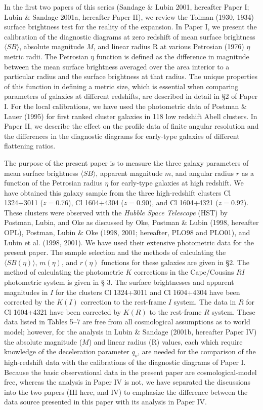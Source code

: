 \documentclass[preprint]{aastex}
\begin{document}
In the first two papers of this series (Sandage \& Lubin 2001,
hereafter Paper I; Lubin \& Sandage 2001a, hereafter Paper II), we
review the Tolman (1930, 1934) surface brightness test for the reality
of the expansion. In Paper I, we present the calibration of the
diagnostic diagrams at zero redshift of mean surface brightness
$\langle SB \rangle$, absolute magnitude $M$, and linear radius R at
various Petrosian (1976) $\eta$ metric radii. The Petrosian $\eta$
function is defined as the difference in magnitude between the mean
surface brightness averaged over the area interior to a particular
radius and the surface brightness at that radius. The unique
properties of this function in defining a metric size, which is
essential when comparing parameters of galaxies at different
redshifts, are described in detail in \S2 of Paper I.  For the local
calibrations, we have used the photometric data of Postman \& Lauer
(1995) for first ranked cluster galaxies in 118 low redshift Abell
clusters. In Paper II, we describe the effect on the profile data of
finite angular resolution and the differences in the diagnostic
diagrams for early-type galaxies of different flattening ratios.
         
The purpose of the present paper is to measure the three galaxy
parameters of mean surface brightness $\langle SB \rangle$, apparent
magnitude $m$, and angular radius $r$ as a function of the Petrosian
radius $\eta$ for early-type galaxies at high redshift. We have
obtained this galaxy sample from the three high-redshift clusters Cl
1324+3011 ($z = 0.76$), Cl 1604+4304 ($z = 0.90$), and Cl 1604+4321
($z = 0.92$). These clusters were observed with the {\it Hubble Space
Telescope} (HST) by Postman, Lubin, and Oke as discussed by Oke,
Postman \& Lubin (1998, hereafter OPL), Postman, Lubin \& Oke (1998,
2001; hereafter, PLO98 and PLO01), and Lubin et al. (1998, 2001). We
have used their extensive photometric data for the present paper.  The
sample selection and the methods of calculating the $\langle SB (\eta)
\rangle$, $m(\eta)$, and $r(\eta)$ functions for these galaxies are
given in \S 2. The method of calculating the photometric $K$
corrections in the Cape/Cousins $RI$ photometric system is given in \S
3. The surface brightnesses and apparent magnitudes in $I$ for the
clusters Cl 1324+3011 and Cl 1604+4304 have been corrected by the
$K(I)$ correction to the rest-frame $I$ system.  The data in $R$ for
Cl 1604+4321 have been corrected by $K(R)$ to the rest-frame $R$
system. These data listed in Tables 5--7 are free from all
cosmological assumptions as to world model; however, for the analysis
in Lubin \& Sandage (2001b, hereafter Paper IV) the absolute magnitude
($M$) and linear radius (R) values, each which require knowledge of
the deceleration parameter $q_o$, are needed for the comparison of the
high-redshift data with the calibrations of the diagnostic diagrams of
Paper I.  Because the basic observational data in the present paper
are cosmological-model free, whereas the analysis in Paper IV is not,
we have separated the discussions into the two papers (III here, and
IV) to emphasize the difference between the data source presented in
this paper with its analysis in Paper IV.
\end{document}
